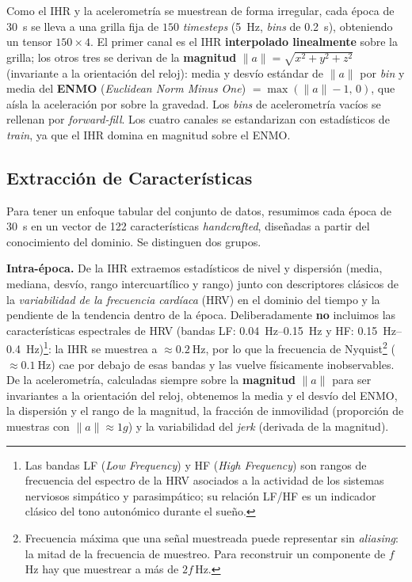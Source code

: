 \documentclass[conference]{IEEEtran}
\begin{document}
Como el IHR y la acelerometría se muestrean de forma irregular, cada época de \qty{30}{\second} se lleva a una grilla fija de $150$ \textit{timesteps} (\qty{5}{\hertz}, \textit{bins} de \qty{0.2}{\second}), obteniendo un tensor $150\times4$. El primer canal es el IHR \textbf{interpolado linealmente} sobre la grilla; los otros tres se derivan de la \textbf{magnitud} $\lVert a \rVert = \sqrt{x^2+y^2+z^2}$ (invariante a la orientación del reloj): media y desvío estándar de $\lVert a \rVert$ por \textit{bin} y media del \textbf{ENMO} (\emph{Euclidean Norm Minus One}) $=\max(\lVert a \rVert - 1,\,0)$, que aísla la aceleración por sobre la gravedad. Los \textit{bins} de acelerometría vacíos se rellenan por \textit{forward-fill}. Los cuatro canales se estandarizan con estadísticos de \emph{train}, ya que el IHR domina en magnitud sobre el ENMO.

\subsection{Extracción de Características}\label{sec:feature_extraction}

Para tener un enfoque tabular del conjunto de datos, resumimos cada época de \qty{30}{\second} en un vector de 122 características \emph{handcrafted}, diseñadas a partir del conocimiento del dominio. Se distinguen dos grupos.

\textbf{Intra-época.} De la IHR extraemos estadísticos de nivel y dispersión (media, mediana, desvío, rango intercuartílico y rango) junto con descriptores clásicos de la \emph{variabilidad de la frecuencia cardíaca} (HRV) en el dominio del tiempo y la pendiente de la tendencia dentro de la época. Deliberadamente \textbf{no} incluimos las características espectrales de HRV (bandas LF: \qtyrange{0.04}{0.15}{\hertz} y HF: \qtyrange{0.15}{0.4}{\hertz})\footnote{Las bandas LF (\emph{Low Frequency}) y HF (\emph{High Frequency}) son rangos de frecuencia del espectro de la HRV asociados a la actividad de los sistemas nerviosos simpático y parasimpático; su relación LF/HF es un indicador clásico del tono autonómico durante el sueño.}: la IHR se muestrea a $\approx\!\qty{0.2}{\hertz}$, por lo que la frecuencia de Nyquist\footnote{Frecuencia máxima que una señal muestreada puede representar sin \emph{aliasing}: la mitad de la frecuencia de muestreo. Para reconstruir un componente de $f$\,Hz hay que muestrear a más de $2f$\,Hz.} ($\approx\!\qty{0.1}{\hertz}$) cae por debajo de esas bandas y las vuelve físicamente inobservables. De la acelerometría, calculadas siempre sobre la \textbf{magnitud} $\lVert a \rVert$ para ser invariantes a la orientación del reloj, obtenemos la media y el desvío del ENMO, la dispersión y el rango de la magnitud, la fracción de inmovilidad (proporción de muestras con $\lVert a\rVert\!\approx\!1g$) y la variabilidad del \emph{jerk} (derivada de la magnitud).
\end{document}
